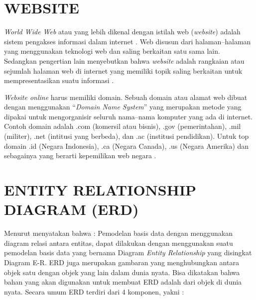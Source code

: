\section{\uppercase{Website}}
\textit{World Wide Web} atau yang lebih dikenal dengan istilah web (\textit{website}) adalah sistem pengakses informasi dalam internet \citep{abdul2014pengenalan}. Web disusun dari halaman–halaman yang menggunakan teknologi web dan saling berkaitan satu sama lain. Sedangkan pengertian lain menyebutkan bahwa \textit{website} adalah rangkaian atau sejumlah halaman web di internet yang memiliki topik saling berkaitan untuk mempresentasikan suatu informasi \citep{ginanjar2014rahasia}.

\par \textit{Website online} harus memiliki domain. Sebuah domain atau alamat web dibuat dengan menggunakan “\textit{Domain Name System}” yang merupakan metode yang dipakai untuk mengorganisir seluruh nama–nama komputer yang ada di internet. Contoh domain adalah .com (komersil atau bisnis), .gov (pemerintahan), .mil (militer), .net (intitusi yang berbeda), dan .ac (institusi pendidikan). Untuk top domain .id (Negara Indonesia), .ca (Negara Canada), .us (Negara Amerika) dan sebagainya yang berarti kepemilikan web negara \citep{dhika2015perancangan}.

\section{\uppercase{Entity Relationship Diagram (ERD)}}
Menurut \citep{priyadi2014} menyatakan bahwa : Pemodelan basis data dengan menggunakan diagram relasi antara entitas, dapat dilakukan dengan menggunakan suatu pemodelan basis data yang bernama Diagram \textit{Entity Relationship} yang disingkat Diagram E-R. ERD juga merupakan gambaran yang menghubungkan antara objek satu dengan objek yang lain dalam dunia nyata. Bisa dikatakan bahwa bahan yang akan digunakan untuk membuat ERD adalah dari objek di dunia nyata. Secara umum ERD terdiri dari 4 komponen, yakni :

